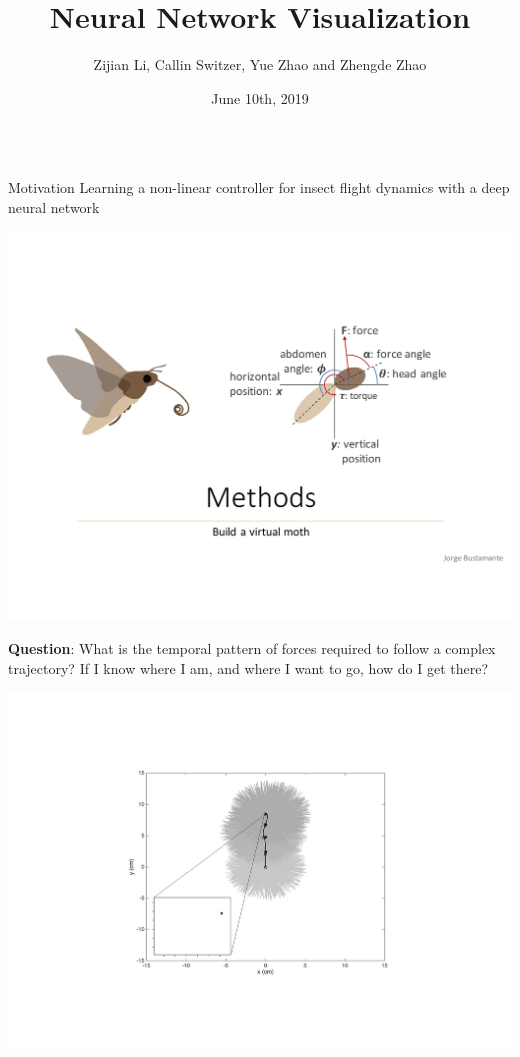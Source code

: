 \documentclass[final,hyperref={pdfpagelabels=false}]{beamer}
\title[NNV]{Neural Network Visualization}
\author{Zijian Li, Callin Switzer, Yue Zhao and Zhengde Zhao}
\institute{University of Washington}
\date{June 10th, 2019}
\begin{document}
  \begin{frame}{}

    \begin{columns}[t]
      \begin{column}{.33\linewidth}
        \begin{block}{Motivation}
 \noindent       Learning a non-linear controller for insect flight dynamics with a deep neural network
 \begin{center}
          \includegraphics[scale=0.9]{s1.pdf}
  \end{center}         
\noindent        \textbf{ Question}: What is the temporal pattern of forces required to follow a complex trajectory?  If I know where I am, and where I want to go, how do I get there?
\begin{center}
          \includegraphics[scale=1]{s3.pdf}

\end{center}
\end{block}
\end{column}
\end{columns}
\end{frame}
\end{document}

